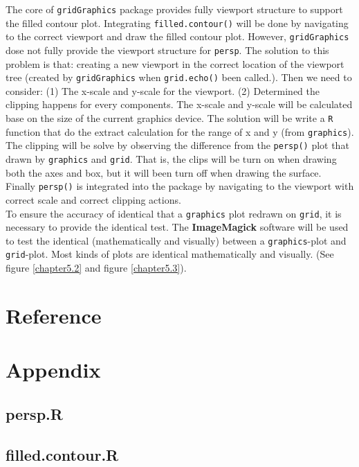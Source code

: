 \documentclass[paper=a4, fontsize=11pt]{report}
\begin{document}
The core of \texttt{gridGraphics} package provides fully viewport structure to support the filled contour plot. Integrating \texttt{filled.contour()} will be done by navigating to the correct viewport and draw the filled contour plot. However, \texttt{gridGraphics} dose not fully provide the viewport structure for \texttt{persp}. The solution to this problem is that: creating a new viewport in the correct location of the viewport tree (created by \texttt{gridGraphics} when \texttt{grid.echo()} been called.). Then we need to consider: (1) The x-scale and y-scale for the viewport. (2) Determined the clipping happens for every components. The x-scale and y-scale will be calculated base on the size of the current graphics device. The solution will be write a \texttt{R} function that do the extract calculation for the range of x and y (from \texttt{graphics}). The clipping will be solve by observing the difference from the \texttt{persp()} plot that drawn by \texttt{graphics} and \texttt{grid}. That is, the clips will be turn on when drawing both the axes and box, but it will been turn off when drawing the surface. Finally \texttt{persp()} is integrated into the package by navigating to the viewport with correct scale and correct clipping actions.\\

To ensure the accuracy of identical that a \texttt{graphics} plot redrawn on \texttt{grid}, it is necessary to provide the identical test. The \textbf{ImageMagick} software will be used to test the identical (mathematically and visually) between a \texttt{graphics}-plot and \texttt{grid}-plot. Most kinds of plots are identical mathematically and visually. (See figure \ref{chapter5.2} and figure \ref{chapter5.3}).



\chapter{Reference}
\chapter{Appendix}
\section{persp.R}
\section{filled.contour.R}
\end{document}

